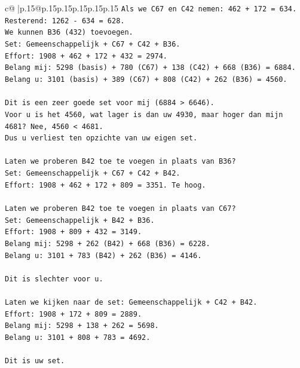 \documentclass{article}
\begin{document}
{\begin{supertabular}{c@{$\;$}|p{.15\linewidth}@{}p{.15\linewidth}p{.15\linewidth}p{.15\linewidth}p{.15\linewidth}p{.15\linewidth}}
{{{\texttt{Als we C67 en C42 nemen: 462 + 172 = 634.} \\
\texttt{Resterend: 1262 {-} 634 = 628.} \\
\texttt{We kunnen B36 (432) toevoegen.} \\
\texttt{Set: Gemeenschappelijk + C67 + C42 + B36.} \\
\texttt{Effort: 1908 + 462 + 172 + 432 = 2974.} \\
\texttt{Belang mij: 5298 (basis) + 780 (C67) + 138 (C42) + 668 (B36) = 6884.} \\
\texttt{Belang u: 3101 (basis) + 389 (C67) + 808 (C42) + 262 (B36) = 4560.} \\
\\ 
\texttt{Dit is een zeer goede set voor mij (6884 > 6646).} \\
\texttt{Voor u is het 4560, wat lager is dan uw 4930, maar hoger dan mijn 4681? Nee, 4560 < 4681.} \\
\texttt{Dus u verliest ten opzichte van uw eigen set.} \\
\\ 
\texttt{Laten we proberen B42 toe te voegen in plaats van B36?} \\
\texttt{Set: Gemeenschappelijk + C67 + C42 + B42.} \\
\texttt{Effort: 1908 + 462 + 172 + 809 = 3351. Te hoog.} \\
\\ 
\texttt{Laten we proberen B42 toe te voegen in plaats van C67?} \\
\texttt{Set: Gemeenschappelijk + B42 + B36.} \\
\texttt{Effort: 1908 + 809 + 432 = 3149.} \\
\texttt{Belang mij: 5298 + 262 (B42) + 668 (B36) = 6228.} \\
\texttt{Belang u: 3101 + 783 (B42) + 262 (B36) = 4146.} \\
\\ 
\texttt{Dit is slechter voor u.} \\
\\ 
\texttt{Laten we kijken naar de set: Gemeenschappelijk + C42 + B42.} \\
\texttt{Effort: 1908 + 172 + 809 = 2889.} \\
\texttt{Belang mij: 5298 + 138 + 262 = 5698.} \\
\texttt{Belang u: 3101 + 808 + 783 = 4692.} \\
\\ 
\texttt{Dit is uw set.} \\
\\ 
}}}
\end{supertabular}}
\end{document}
